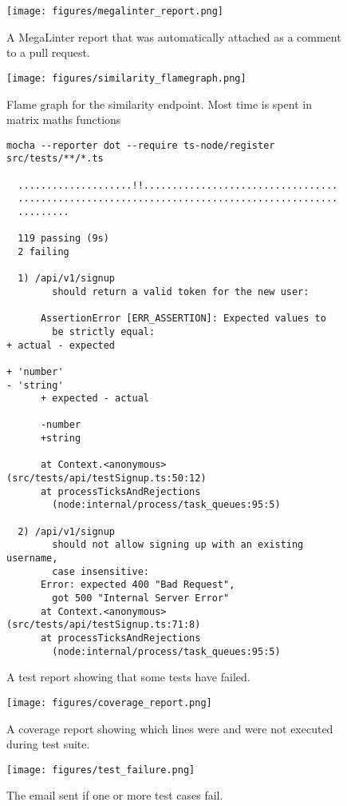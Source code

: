 \begin{figure}[ht]
  \centering
  \caption{\label{fig:metalinter_report}A MegaLinter report that was automatically attached as a comment to a pull request.}
  \texttt{[image: figures/megalinter\_report.png]}
\end{figure}

\begin{figure}
  \centering
  \caption{\label{fig:similarity_flamegraph}Flame graph for the similarity endpoint. Most time is spent in matrix maths functions}
  \texttt{[image: figures/similarity\_flamegraph.png]}
\end{figure}

\begin{figure}
  \centering
  \caption{\label{fig:test_report}A test report showing that some tests have failed.}
  \begin{verbatim}
mocha --reporter dot --require ts-node/register src/tests/**/*.ts

  ....................!!..................................
  ........................................................
  .........

  119 passing (9s)
  2 failing

  1) /api/v1/signup
        should return a valid token for the new user:

      AssertionError [ERR_ASSERTION]: Expected values to
        be strictly equal:
+ actual - expected

+ 'number'
- 'string'
      + expected - actual

      -number
      +string

      at Context.<anonymous> (src/tests/api/testSignup.ts:50:12)
      at processTicksAndRejections
        (node:internal/process/task_queues:95:5)

  2) /api/v1/signup
        should not allow signing up with an existing username,
        case insensitive:
      Error: expected 400 "Bad Request",
        got 500 "Internal Server Error"
      at Context.<anonymous> (src/tests/api/testSignup.ts:71:8)
      at processTicksAndRejections
        (node:internal/process/task_queues:95:5)
  \end{verbatim}
\end{figure}

\begin{figure}
  \centering
  \caption{\label{fig:coverage_report}A coverage report showing which lines were and were not executed during test suite.}
  \texttt{[image: figures/coverage\_report.png]}
\end{figure}

\begin{figure}
  \centering
  \caption{\label{fig:test_failure}The email sent if one or more test cases fail.}
  \texttt{[image: figures/test\_failure.png]}
\end{figure}
